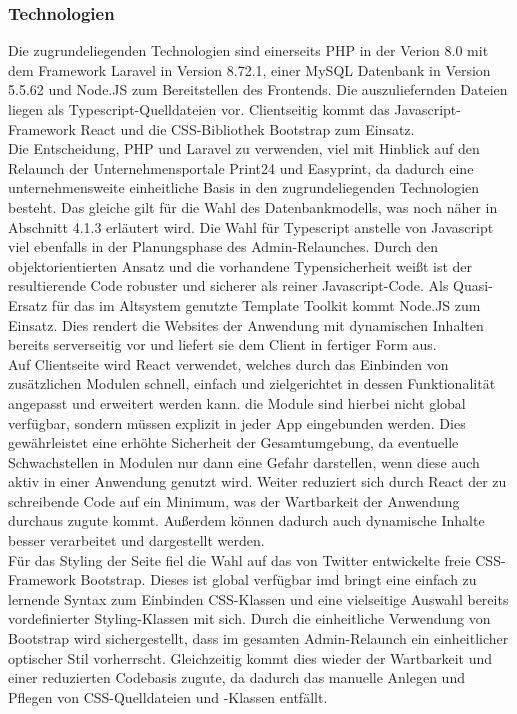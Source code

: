     \subsubsection{Technologien}
        Die zugrundeliegenden Technologien sind einerseits PHP in der Verion 8.0 mit dem Framework \glqq Laravel\grqq{} in Version 8.72.1, einer MySQL Datenbank in Version 5.5.62 und Node.JS zum Bereitstellen des Frontends. Die auszuliefernden Dateien liegen als Typescript-Quelldateien vor. Clientseitig kommt das Javascript-Framework \glqq React\grqq{} und die CSS-Bibliothek \glqq Bootstrap\grqq{} zum Einsatz.\\
        Die Entscheidung, PHP und Laravel zu verwenden, viel mit Hinblick auf den Relaunch der Unternehmensportale \glqq Print24\grqq{} und \glqq Easyprint\grqq{}, da dadurch eine unternehmensweite einheitliche Basis in den zugrundeliegenden Technologien besteht. Das gleiche gilt für die Wahl des Datenbankmodells, was noch näher in Abschnitt 4.1.3 erläutert wird. Die Wahl für Typescript anstelle von Javascript viel ebenfalls in der Planungsphase des Admin-Relaunches. Durch den objektorientierten Ansatz und die vorhandene Typensicherheit weißt ist der resultierende Code robuster und sicherer als reiner Javascript-Code. Als Quasi-Ersatz für das im Altsystem genutzte Template Toolkit kommt Node.JS zum Einsatz. Dies rendert die Websites der Anwendung mit dynamischen Inhalten bereits serverseitig vor und liefert sie dem Client in fertiger Form aus.\\
        Auf Clientseite wird React verwendet, welches durch das Einbinden von zusätzlichen Modulen schnell, einfach und zielgerichtet in dessen Funktionalität angepasst und erweitert werden kann. die Module sind hierbei nicht global verfügbar, sondern müssen explizit in jeder App eingebunden werden. Dies gewährleistet eine erhöhte Sicherheit der Gesamtumgebung, da eventuelle Schwachstellen in Modulen nur dann eine Gefahr darstellen, wenn diese auch aktiv in einer Anwendung genutzt wird. Weiter reduziert sich durch React der zu schreibende Code auf ein Minimum, was der Wartbarkeit der Anwendung durchaus zugute kommt. Außerdem können dadurch auch dynamische Inhalte besser verarbeitet und dargestellt werden.\\
        Für das Styling der Seite fiel die Wahl auf das von Twitter entwickelte freie CSS-Framework Bootstrap. Dieses ist global verfügbar imd bringt eine einfach zu lernende Syntax zum Einbinden CSS-Klassen und eine vielseitige Auswahl bereits vordefinierter Styling-Klassen mit sich. Durch die einheitliche Verwendung von Bootstrap wird sichergestellt, dass im gesamten Admin-Relaunch ein einheitlicher optischer Stil vorherrscht. Gleichzeitig kommt dies wieder der Wartbarkeit und einer reduzierten Codebasis zugute, da dadurch das manuelle Anlegen und Pflegen von CSS-Quelldateien und -Klassen entfällt.

